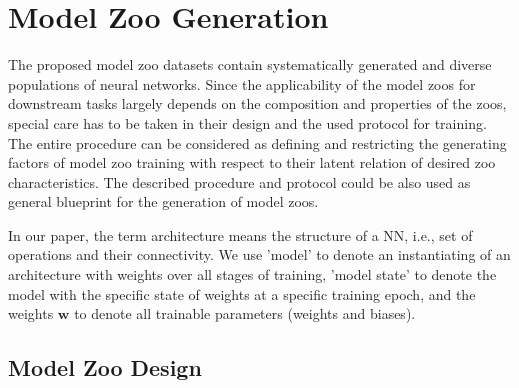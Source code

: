 \section{Model Zoo Generation}
\vspace{-1pt}
The proposed model zoo datasets contain systematically generated and diverse populations of neural networks.
Since the applicability of the model zoos for downstream tasks largely depends on the composition and properties 
of the zoos, special care has to be taken in their design and the used protocol for training. 
The entire procedure can be considered as defining and restricting the generating factors of
model zoo training with respect to their latent relation of desired zoo characteristics. 
%
The described procedure and protocol could be also used as general blueprint for the generation of model zoos.

In our paper, the term architecture means the structure of a NN, i.e., set of operations and their connectivity. 
We use 'model' to denote an instantiating of an architecture with weights over all stages of training, 'model state' to denote the model with the specific state of weights at a specific training epoch, and the weights ${\textbf{w}}$ to denote all trainable parameters (weights and biases).

%
%
\subsection{Model Zoo Design}
\label{sec:generation}

\vspace{-3pt}
